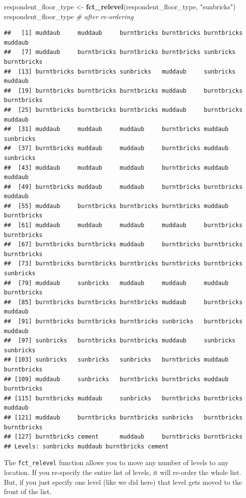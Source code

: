\documentclass[]{book}
\newenvironment{Shaded}{\begin{snugshade}}{\end{snugshade}}
\newcommand{\KeywordTok}[1]{\textcolor[rgb]{0.13,0.29,0.53}{\textbf{#1}}}
\newcommand{\StringTok}[1]{\textcolor[rgb]{0.31,0.60,0.02}{#1}}
\newcommand{\CommentTok}[1]{\textcolor[rgb]{0.56,0.35,0.01}{\textit{#1}}}
\newcommand{\NormalTok}[1]{#1}
\begin{document}
\begin{Shaded}
\begin{Highlighting}[]
\NormalTok{respondent_floor_type <-}\StringTok{ }\KeywordTok{fct_relevel}\NormalTok{(respondent_floor_type, }\StringTok{"sunbricks"}\NormalTok{)}
\NormalTok{respondent_floor_type }\CommentTok{# after re-ordering}
\end{Highlighting}
\end{Shaded}

\begin{verbatim}
##   [1] muddaub     muddaub     burntbricks burntbricks burntbricks muddaub    
##   [7] muddaub     burntbricks burntbricks burntbricks sunbricks   burntbricks
##  [13] burntbricks burntbricks sunbricks   muddaub     sunbricks   muddaub    
##  [19] burntbricks burntbricks burntbricks muddaub     burntbricks burntbricks
##  [25] burntbricks burntbricks burntbricks muddaub     burntbricks muddaub    
##  [31] muddaub     muddaub     muddaub     burntbricks muddaub     sunbricks  
##  [37] burntbricks muddaub     muddaub     burntbricks muddaub     sunbricks  
##  [43] muddaub     muddaub     muddaub     burntbricks muddaub     muddaub    
##  [49] burntbricks muddaub     muddaub     burntbricks burntbricks muddaub    
##  [55] muddaub     burntbricks burntbricks burntbricks muddaub     burntbricks
##  [61] muddaub     muddaub     muddaub     muddaub     burntbricks burntbricks
##  [67] burntbricks burntbricks muddaub     burntbricks burntbricks burntbricks
##  [73] burntbricks burntbricks burntbricks burntbricks burntbricks sunbricks  
##  [79] muddaub     sunbricks   muddaub     muddaub     muddaub     burntbricks
##  [85] burntbricks burntbricks burntbricks muddaub     burntbricks muddaub    
##  [91] burntbricks burntbricks burntbricks sunbricks   burntbricks muddaub    
##  [97] sunbricks   burntbricks burntbricks muddaub     sunbricks   sunbricks  
## [103] sunbricks   sunbricks   sunbricks   burntbricks muddaub     burntbricks
## [109] muddaub     sunbricks   burntbricks burntbricks muddaub     burntbricks
## [115] burntbricks muddaub     sunbricks   burntbricks burntbricks muddaub    
## [121] muddaub     burntbricks burntbricks sunbricks   burntbricks burntbricks
## [127] burntbricks cement      muddaub     burntbricks burntbricks
## Levels: sunbricks muddaub burntbricks cement
\end{verbatim}

The \texttt{fct\_relevel} function allows you to move any number of
levels to any location. If you re-specify the entire list of levels, it
will re-order the whole list. But, if you just specify one level (like
we did here) that level gets moved to the front of the list.
\end{document}

